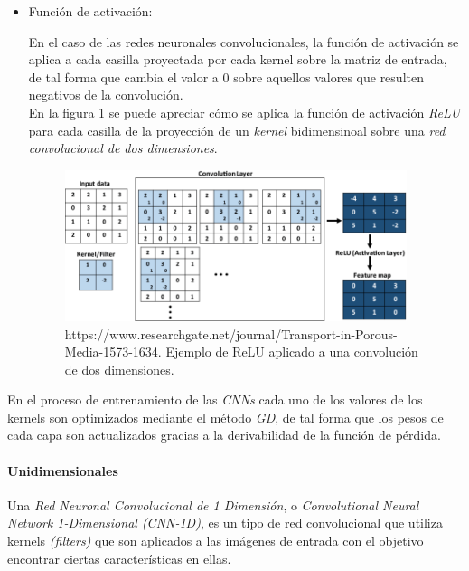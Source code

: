 \begin{itemize}
                    \item Función de activación:


                        En el caso de las redes neuronales convolucionales, la función de activación se aplica a cada casilla proyectada por cada kernel sobre la matriz de entrada, de tal forma que cambia el valor a $0$ sobre aquellos valores que resulten negativos de la convolución.\\

                        En la figura \ref{CNNRELUImage} se puede apreciar cómo se aplica la función de activación \textit{ReLU} para cada casilla de la proyección de un \textit{kernel} bidimensinoal sobre una \textit{red convolucional de dos dimensiones}.



                        \begin{figure}[h]
                            \centering
                            \includegraphics[width=10cm]{archivos/3.Tecnologias/RedesNeuronales/CNN/CNNRELUImage}
                            \caption{https://www.researchgate.net/journal/Transport-in-Porous-Media-1573-1634. Ejemplo de ReLU aplicado a una convolución de dos dimensiones.}
                            \label{CNNRELUImage}
                         \end{figure}

                \end{itemize}

                En el proceso de entrenamiento de las \textit{CNNs} cada uno de los valores de los kernels son optimizados mediante el método \textit{GD}, de tal forma que los pesos de cada capa son actualizados gracias a la derivabilidad de la función de pérdida.\\


                \paragraph{Unidimensionales}
                
                    Una \textit{Red Neuronal Convolucional de 1 Dimensión}, o \textit{Convolutional Neural Network 1-Dimensional (CNN-1D)}, es un tipo de red convolucional que utiliza kernels \textit{(filters)} que son aplicados a las imágenes de entrada con el objetivo encontrar ciertas características en ellas.\\

